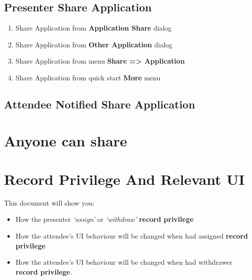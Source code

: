 \documentclass[letterpaper,10pt,english]{sphinxmanual}
\begin{document}
\section{Presenter Share Application}
\label{app_share:presenter-share-application}\begin{enumerate}
\item {} 
Share Application from \textbf{Application Share} dialog

\item {} 
Share Application from \textbf{Other Application} dialog

\item {} 
Share Application from menu \textbf{Share =\textgreater{} Application}

\item {} 
Share Application from quick start \textbf{More} menu

\end{enumerate}


\section{Attendee Notified Share Application}
\label{app_share:attendee-notified-share-application}

\chapter{Anyone can share}
\label{anyone_can_share:anyone-can-share}\label{anyone_can_share::doc}

\chapter{Record Privilege And Relevant UI}
\label{record_logic:record-privilege-and-relevant-ui}\label{record_logic::doc}
This document will show you:
\begin{itemize}
\item {} 
How the presenter \emph{`assign'} or \emph{`withdraw'} \textbf{record privilege}

\item {} 
How the attendee's UI behaviour will be changed when had assigned \textbf{record privilege}

\item {} 
How the attendee's UI behaviour will be changed when had withdrawer \textbf{record privilege}.

\end{itemize}
\end{document}

